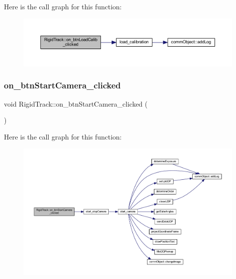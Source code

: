 Here is the call graph for this function\+:\nopagebreak
\begin{figure}[H]
\begin{center}
\leavevmode
\includegraphics[width=350pt]{class_rigid_track_a2224d3f6d923a1c7bad356f49d7a4124_cgraph}
\end{center}
\end{figure}
\mbox{\label{class_rigid_track_a2f226856e28868c8bb1854fa16531f60}} 
\subsubsection{on\+\_\+btn\+Start\+Camera\+\_\+clicked}
{\footnotesize\ttfamily void Rigid\+Track\+::on\+\_\+btn\+Start\+Camera\+\_\+clicked (\begin{DoxyParamCaption}{ }\end{DoxyParamCaption})\hspace{0.3cm}{\ttfamily [slot]}}

Here is the call graph for this function\+:\nopagebreak
\begin{figure}[H]
\begin{center}
\leavevmode
\includegraphics[width=350pt]{class_rigid_track_a2f226856e28868c8bb1854fa16531f60_cgraph}
\end{center}
\end{figure}
\mbox{\label{class_rigid_track_afb1a4edcacc818db4ec6bb017dd07e0f}} 
